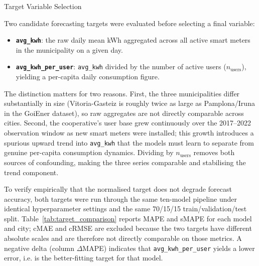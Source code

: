 ﻿\documentclass[12pt,reqno, twoside]{amsbook}
\makeatletter
\numberwithin{figure}{chapter}
\numberwithin{table}{chapter}
\numberwithin{equation}{chapter}
\def\subsection{\@startsection{subsection}{2}%
      \z@{.5\linespacing\@plus.7\linespacing}{.25\linespacing}%
      {\normalfont\bfseries\flushleft}}
\theoremstyle{plain}
\numberwithin{equation}{chapter}
\numberwithin{section}{chapter}
\makeatother
\begin{document}
\subsection{Target Variable Selection}
\label{subsec:target_variable}

Two candidate forecasting targets were evaluated before selecting a final variable:

\begin{itemize}
    \item \textbf{\texttt{avg\_kwh}}: the raw daily mean kWh aggregated across all active smart meters in the municipality on a given day.
    \item \textbf{\texttt{avg\_kwh\_per\_user}}: \texttt{avg\_kwh} divided by the number of active users ($n_{\text{users}}$), yielding a per-capita daily consumption figure.
\end{itemize}

The distinction matters for two reasons. First, the three municipalities differ substantially in size (Vitoria-Gasteiz is roughly twice as large as Pamplona/Iruna in the GoiEner dataset), so raw aggregates are not directly comparable across cities. Second, the cooperative's user base grew continuously over the 2017--2022 observation window as new smart meters were installed; this growth introduces a spurious upward trend into \texttt{avg\_kwh} that the models must learn to separate from genuine per-capita consumption dynamics. Dividing by $n_{\text{users}}$ removes both sources of confounding, making the three series comparable and stabilising the trend component.

To verify empirically that the normalised target does not degrade forecast accuracy, both targets were run through the same ten-model pipeline under identical hyperparameter settings and the same 70/15/15 train/validation/test split. Table~\ref{tab:target_comparison} reports \ac{MAPE} and \ac{sMAPE} for each model and city; c{MAE} and c{RMSE} are excluded because the two targets have different absolute scales and are therefore not directly comparable on those metrics. A negative delta (column $\Delta$\ac{MAPE}) indicates that \texttt{avg\_kwh\_per\_user} yields a lower error, i.e. is the better-fitting target for that model.
\end{document}
